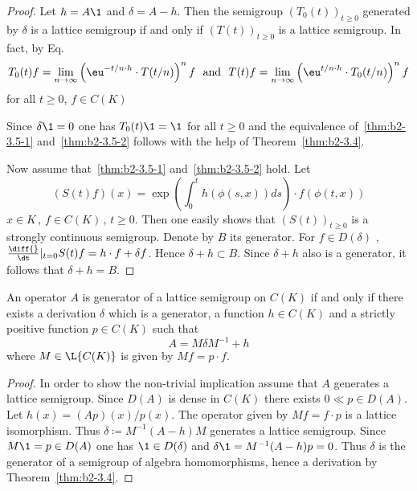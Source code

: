 \begin{proof}
Let $h = A\1$ and $\delta = A - h$.
Then the semigroup $(T_{0}(t))_{t \geq 0}$ generated by $\delta$ is a lattice semigroup if and only if\/ $(T(t))_{t \geq 0}$ is a lattice semigroup. In fact, by 
Eq.~ %
\[
T_{0}(t)f = \lim_{n \to \infty} \left(\eu^{-t/n \cdot h} \cdot T(t/n)\right)^{n}f 
\ \text{ and }\  
 T(t)f = \lim_{n \to \infty} \left(\eu^{{t/n} \cdot h} \cdot T_{0}(t/n)\right)^{n}f
\]
 for all $t \geq 0$, $f \in C(K)$

Since $\delta \1 = 0$ one has $T_{0}(t)\1 = \1$ for all $t \geq 0$ and the equivalence of~\ref{thm:b2-3.5-1} and~\ref{thm:b2-3.5-2} follows with the help of Theorem~\ref{thm:b2-3.4}.

Now assume that~\ref{thm:b2-3.5-1} and~\ref{thm:b2-3.5-2} hold.
Let
\[
(S(t)f) (x) = \exp\left( \int_{0}^{t} h(\phi(s,x))ds \right) \cdot f(\phi(t,x))
\]
$x \in K$\,, $f \in C (K)$\,, $t \geq 0$. 
Then one easily shows that $(S(t))_{t\geq 0}$ is a strongly con\-tinu\-ous semigroup.
Denote by $B$ its generator.
For $f \in D(\delta)$ , $\frac{\diff{}}{\dt}|_{t = 0}S(t)f = h \cdot f + \delta f$.
Hence $\delta + h \subset B$.  Since $\delta + h$ also is a generator, it follows that $\delta + h = B$.
\end{proof}


\begin{theorem}\label{thm:b2-3.6}
An operator $A$ is generator of a lattice semigroup on $C(K)$ if and only if there exists a derivation $\delta$ which is a generator, a function $h \in C(K)$ and a strictly positive function $p \in C(K)$ such that
\begin{equation} \label{eq:b2-3.7}
A = M\delta M^{-1} + h
\end{equation}
where $M \in \L{C(K)}$ is given by $Mf = p \cdot f$.
\end{theorem}

\begin{proof}
In order to show the non-trivial implication assume that $A$ generates a lattice semigroup.
Since $D(A)$ is dense in $C(K)$ there exists $0 \ll p \in D(A)$.
Let $h(x) = (Ap)(x)/p(x)$.
The operator given by $Mf = f \cdot p$ is a lattice isomorphism.
Thus $\delta \coloneqq M^{-1}(A - h)M$ generates a lattice semigroup.
Since $M\1 = p \in D(A)$ one has $\1 \in D(\delta)$ and $\delta\1 = M^{-1}(A - h)p = 0$.
Thus $\delta$ is the generator of a semigroup of algebra homomorphisms, hence a derivation by Theorem~\ref{thm:b2-3.4}.
\end{proof}

